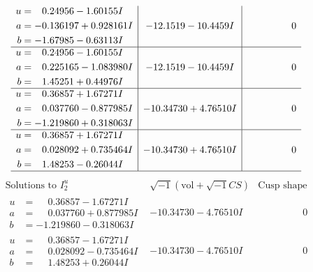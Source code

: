 \documentclass[1p]{elsarticle_modified}
\theoremstyle{definition}
\newcommand{\I}{\sqrt{-1}}
\begin{document}
$$\begin{array}{c|c|c}
\begin{aligned}
u &= \phantom{-}0.24956 - 1.60155 I \\
a &= -0.136197 + 0.928161 I \\
b &= -1.67985 - 0.63113 I\end{aligned}
 & -12.1519 - 10.4459 I & \phantom{-0.000000 } 0 \\ \hline\begin{aligned}
u &= \phantom{-}0.24956 - 1.60155 I \\
a &= \phantom{-}0.225165 - 1.083980 I \\
b &= \phantom{-}1.45251 + 0.44976 I\end{aligned}
 & -12.1519 - 10.4459 I & \phantom{-0.000000 } 0 \\ \hline\begin{aligned}
u &= \phantom{-}0.36857 + 1.67271 I \\
a &= \phantom{-}0.037760 - 0.877985 I \\
b &= -1.219860 + 0.318063 I\end{aligned}
 & -10.34730 + 4.76510 I & \phantom{-0.000000 } 0 \\ \hline\begin{aligned}
u &= \phantom{-}0.36857 + 1.67271 I \\
a &= \phantom{-}0.028092 + 0.735464 I \\
b &= \phantom{-}1.48253 - 0.26044 I\end{aligned}
 & -10.34730 + 4.76510 I & \phantom{-0.000000 } 0\\
 \hline 
 \end{array}$$\newpage$$\begin{array}{c|c|c}  
\text{Solutions to }I^u_{2}& \I (\text{vol} + \sqrt{-1}CS) & \text{Cusp shape}\\
 \hline 
\begin{aligned}
u &= \phantom{-}0.36857 - 1.67271 I \\
a &= \phantom{-}0.037760 + 0.877985 I \\
b &= -1.219860 - 0.318063 I\end{aligned}
 & -10.34730 - 4.76510 I & \phantom{-0.000000 } 0 \\ \hline\begin{aligned}
u &= \phantom{-}0.36857 - 1.67271 I \\
a &= \phantom{-}0.028092 - 0.735464 I \\
b &= \phantom{-}1.48253 + 0.26044 I\end{aligned}
 & -10.34730 - 4.76510 I & \phantom{-0.000000 } 0 \\ \hline\begin{aligned}

\end{aligned}
\end{array}$$
\end{document}
